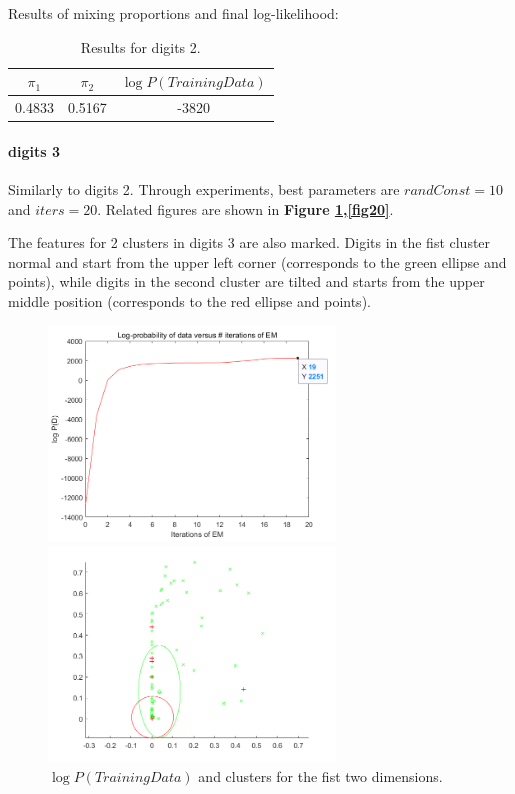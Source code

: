 \documentclass{article}
\begin{document}
Results of mixing proportions and final log-likelihood:
\begin{table}[H]
	\centering
	\caption{Results for digits 2.}
	\label{tab5}
	\begin{tabular}{ccc}
	\toprule
	$\pi_1$ & $\pi_2$ & $\log P(TrainingData)$\\
	\midrule
	0.4833 & 0.5167 & -3820\\
	\bottomrule
	\end{tabular}
\end{table}

\paragraph{digits 3}
Similarly to digits 2. Through experiments, best parameters are $randConst = 10$ and $iters = 20$. Related figures are shown in \textbf{Figure \ref{fig19},\ref{fig20}}.\par
The features for 2 clusters in digits 3 are also marked. Digits in the fist cluster normal and start from the upper left corner (corresponds to the green ellipse and points), while digits in the second cluster are tilted and starts from the upper middle position (corresponds to the red ellipse and points).\par

\begin{figure}[H]
\begin{minipage}[t]{0.5\linewidth}
\centering
\includegraphics[width=3in]{figure19_1}
\end{minipage}%
\begin{minipage}[t]{0.5\linewidth}
\centering
\includegraphics[width=3in]{figure19_2}
\end{minipage}
\caption{$\log P(TrainingData)$ and clusters for the fist two dimensions.}
\label{fig19}
\end{figure}
\end{document}
